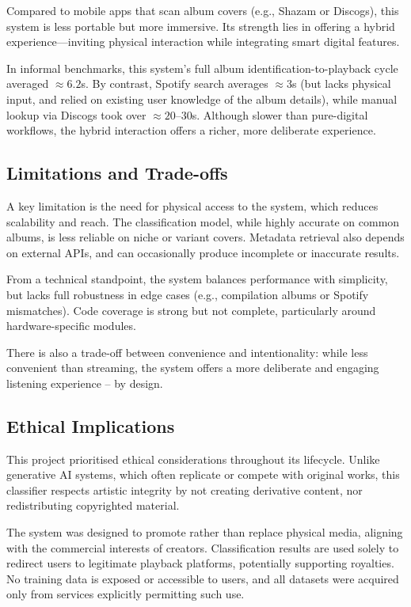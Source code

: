             Compared to mobile apps that scan album covers (e.g., Shazam or Discogs), this system is less portable but more immersive. Its strength lies in offering a hybrid experience—inviting physical interaction while integrating smart digital features.
    
            In informal benchmarks, this system’s full album identification-to-playback cycle averaged $\approx 6.2$s. By contrast, Spotify search averages $\approx 3$s (but lacks physical input, and relied on existing user knowledge of the album details), while manual lookup via Discogs took over $\approx 20–30$s. Although slower than pure-digital workflows, the hybrid interaction offers a richer, more deliberate experience.
    
        \subsection{Limitations and Trade-offs}
    
            A key limitation is the need for physical access to the system, which reduces scalability and reach. The classification model, while highly accurate on common albums, is less reliable on niche or variant covers. Metadata retrieval also depends on external APIs, and can occasionally produce incomplete or inaccurate results.
    
            From a technical standpoint, the system balances performance with simplicity, but lacks full robustness in edge cases (e.g., compilation albums or Spotify mismatches). Code coverage is strong but not complete, particularly around hardware-specific modules.
            
            There is also a trade-off between convenience and intentionality: while less convenient than streaming, the system offers a more deliberate and engaging listening experience -- by design.
    
        \subsection{Ethical Implications}
            
            This project prioritised ethical considerations throughout its lifecycle. Unlike generative AI systems, which often replicate or compete with original works, this classifier respects artistic integrity by not creating derivative content, nor redistributing copyrighted material.
            
            The system was designed to promote rather than replace physical media, aligning with the commercial interests of creators. Classification results are used solely to redirect users to legitimate playback platforms, potentially supporting royalties. No training data is exposed or accessible to users, and all datasets were acquired only from services explicitly permitting such use.
            
